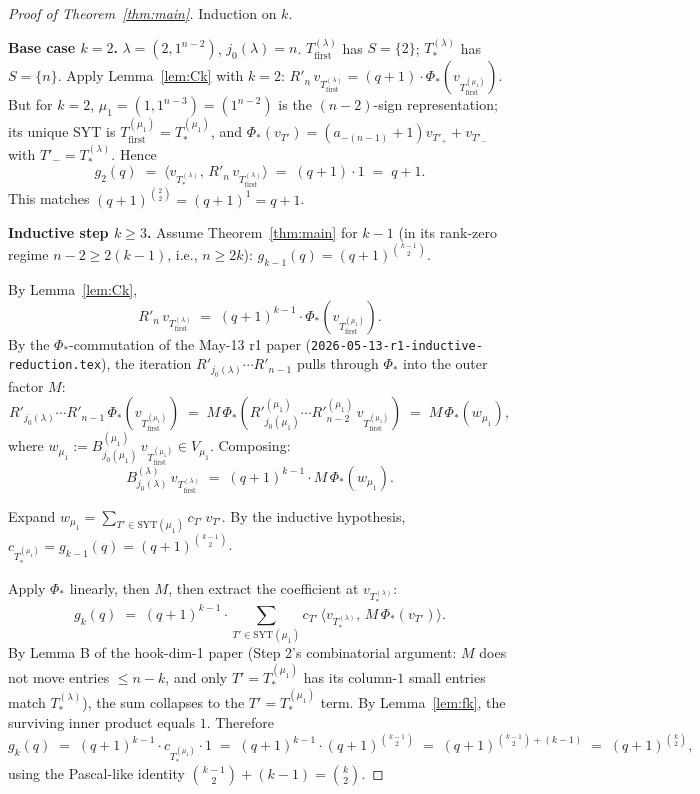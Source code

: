 \documentclass[11pt]{article}
\theoremstyle{definition}
\begin{document}
\begin{proof}[Proof of Theorem~\ref{thm:main}]
Induction on $k$.

\textbf{Base case $k = 2$.}  $\lambda = (2, 1^{n-2})$, $j_0(\lambda) = n$.
$T_{\mathrm{first}}^{(\lambda)}$ has $S = \{2\}$; $T_{*}^{(\lambda)}$ has
$S = \{n\}$.  Apply Lemma~\ref{lem:Ck} with $k = 2$: $R'_n\,
v_{T_{\mathrm{first}}^{(\lambda)}} = (q+1)\cdot \Phi_*(v_{T_{\mathrm{first}}^{(\mu_1)}})$.
But for $k = 2$, $\mu_1 = (1, 1^{n-3}) = (1^{n-2})$ is the
$(n-2)$-sign representation; its unique SYT is
$T_{\mathrm{first}}^{(\mu_1)} = T_{*}^{(\mu_1)}$, and
$\Phi_*(v_{T'}) = (a_{-(n-1)}+1) v_{T'_+} + v_{T'_-}$ with
$T'_- = T_{*}^{(\lambda)}$.  Hence
\[
   g_2(q) \;=\; \langle v_{T_{*}^{(\lambda)}},\, R'_n\,v_{T_{\mathrm{first}}^{(\lambda)}}\rangle
   \;=\; (q+1) \cdot 1 \;=\; q+1.
\]
This matches $(q+1)^{\binom{2}{2}} = (q+1)^1 = q+1$.

\textbf{Inductive step $k \ge 3$.}  Assume Theorem~\ref{thm:main} for
$k - 1$ (in its rank-zero regime $n - 2 \ge 2(k-1)$, i.e., $n \ge 2k$):
$g_{k-1}(q) = (q+1)^{\binom{k-1}{2}}$.

By Lemma~\ref{lem:Ck},
\[
   R'_n\, v_{T_{\mathrm{first}}^{(\lambda)}}
   \;=\; (q+1)^{k-1} \cdot \Phi_*(v_{T_{\mathrm{first}}^{(\mu_1)}}).
\]
By the $\Phi_*$-commutation of the May-13 r1 paper (\texttt{2026-05-13-r1-inductive-reduction.tex}),
the iteration $R'_{j_0(\lambda)} \cdots R'_{n-1}$ pulls through $\Phi_*$
into the outer factor $M$:
\[
   R'_{j_0(\lambda)}\cdots R'_{n-1}\, \Phi_*(v_{T_{\mathrm{first}}^{(\mu_1)}})
   \;=\; M\, \Phi_*\!\left(R'^{(\mu_1)}_{j_0(\mu_1)}\cdots R'^{(\mu_1)}_{n-2}\,
       v_{T_{\mathrm{first}}^{(\mu_1)}}\right)
   \;=\; M\, \Phi_*(w_{\mu_1}),
\]
where $w_{\mu_1} := B^{(\mu_1)}_{j_0(\mu_1)}\, v_{T_{\mathrm{first}}^{(\mu_1)}}
\in V_{\mu_1}$.  Composing:
\[
   B^{(\lambda)}_{j_0(\lambda)}\, v_{T_{\mathrm{first}}^{(\lambda)}}
   \;=\; (q+1)^{k-1} \cdot M\, \Phi_*(w_{\mu_1}).
\]

Expand $w_{\mu_1} = \sum_{T' \in \mathrm{SYT}(\mu_1)} c_{T'}\, v_{T'}$.
By the inductive hypothesis, $c_{T_{*}^{(\mu_1)}} = g_{k-1}(q) =
(q+1)^{\binom{k-1}{2}}$.

Apply $\Phi_*$ linearly, then $M$, then extract the coefficient at
$v_{T_{*}^{(\lambda)}}$:
\[
   g_k(q) \;=\; (q+1)^{k-1} \cdot \sum_{T' \in \mathrm{SYT}(\mu_1)}
       c_{T'}\, \langle v_{T_{*}^{(\lambda)}},\, M\,\Phi_*(v_{T'})\rangle.
\]
By Lemma B of the hook-dim-1 paper (Step 2's combinatorial argument:
$M$ does not move entries $\le n-k$, and only $T' = T_{*}^{(\mu_1)}$
has its column-$1$ small entries match $T_{*}^{(\lambda)}$), the sum
collapses to the $T' = T_{*}^{(\mu_1)}$ term.  By Lemma~\ref{lem:fk},
the surviving inner product equals $1$.  Therefore
\[
   g_k(q) \;=\; (q+1)^{k-1} \cdot c_{T_{*}^{(\mu_1)}} \cdot 1
   \;=\; (q+1)^{k-1} \cdot (q+1)^{\binom{k-1}{2}}
   \;=\; (q+1)^{\binom{k-1}{2} + (k-1)}
   \;=\; (q+1)^{\binom{k}{2}},
\]
using the Pascal-like identity $\binom{k-1}{2} + (k-1) = \binom{k}{2}$.
\end{proof}
\end{document}
